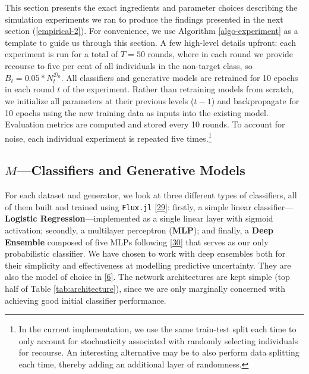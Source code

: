 \documentclass[conference,final,]{IEEEtran}
\theoremstyle{definition}
\theoremstyle{definition}
\theoremstyle{definition}
\theoremstyle{definition}
\theoremstyle{remark}
\begin{document}
This section presents the exact ingredients and parameter choices describing the simulation experiments we ran to produce the findings presented in the next section (\ref{empirical-2}). For convenience, we use Algorithm \ref{algo-experiment} as a template to guide us through this section. A few high-level details upfront: each experiment is run for a total of \(T=50\) rounds, where in each round we provide recourse to five per cent of all individuals in the non-target class, so \(B_t=0.05 * N_t^{\mathcal{D}_0}\). All classifiers and generative models are retrained for 10 epochs in each round \(t\) of the experiment. Rather than retraining models from scratch, we initialize all parameters at their previous levels (\(t-1\)) and backpropagate for 10 epochs using the new training data as inputs into the existing model. Evaluation metrics are computed and stored every 10 rounds. To account for noise, each individual experiment is repeated five times.\footnote{In the current implementation, we use the same train-test split each time to only account for stochasticity associated with randomly selecting individuals for recourse. An interesting alternative may be to also perform data splitting each time, thereby adding an additional layer of randomness.}

\hypertarget{empirical-classifiers}{%
\subsection{\texorpdfstring{\(M\)---Classifiers and Generative Models}{M---Classifiers and Generative Models}}\label{empirical-classifiers}}

For each dataset and generator, we look at three different types of classifiers, all of them built and trained using \texttt{Flux.jl} \protect\hyperlink{ref-innes2018fashionable}{{[}29{]}}: firstly, a simple linear classifier---\textbf{Logistic Regression}---implemented as a single linear layer with sigmoid activation; secondly, a multilayer perceptron (\textbf{MLP}); and finally, a \textbf{Deep Ensemble} composed of five MLPs following \protect\hyperlink{ref-lakshminarayanan2016simple}{{[}30{]}} that serves as our only probabilistic classifier. We have chosen to work with deep ensembles both for their simplicity and effectiveness at modelling predictive uncertainty. They are also the model of choice in \protect\hyperlink{ref-schut2021generating}{{[}6{]}}. The network architectures are kept simple (top half of Table \ref{tab:architecture}), since we are only marginally concerned with achieving good initial classifier performance.
\end{document}
